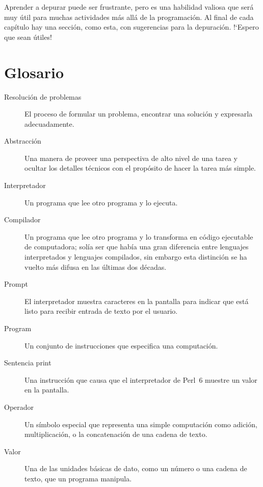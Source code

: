 Aprender a depurar puede ser frustrante, pero es una habilidad valiosa
que será muy útil para muchas actividades más allá de la programación. 
Al final de cada capítulo hay una sección, como esta, con sugerencias para la
depuración. !`Espero que sean útiles!


\section{Glosario}

\begin{description}

\item[Resolución de problemas]  El proceso de formular un problema, 
encontrar una solución y expresarla adecuadamente.

\item[Abstracción] Una manera de proveer una perspectiva de alto nivel
de una tarea y ocultar los detalles técnicos con el propósito de hacer 
la tarea más simple.

\item[Interpretador]  Un programa que lee otro programa y lo ejecuta.

\item[Compilador]  Un programa que lee otro programa y lo transforma en código ejecutable
de computadora; solía ser que había una gran diferencia entre lenguajes
interpretados y lenguajes compilados, sin embargo esta distinción se ha vuelto
más difusa en las últimas dos décadas.

\item[Prompt] El interpretador muestra caracteres en la pantalla para indicar 
que está listo para recibir entrada de texto por el usuario.

\item[Program] Un conjunto de instrucciones que especifica una computación.

\item[Sentencia print]  Una instrucción que causa que el interpretador de Perl~6
muestre un valor en la pantalla. 

\item[Operador]  Un símbolo especial que representa una simple computación como
adición, multiplicación, o la concatenación de una cadena de texto.

\item[Valor]  Una de las unidades básicas de dato, como un número o una
cadena de texto, que un programa manipula.


\end{description}
